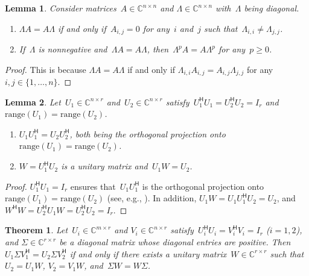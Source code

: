 \documentclass[11pt,a4paper]{article}
\newtheorem{theorem}{Theorem}%
\newtheorem{lemma}{Lemma}%
\theoremstyle{definition}
\def\CC{\mathbb{C}}
\newcommand{\hmt}{{\scriptscriptstyle{{\mathsf{H}}}}}
\newcommand{\range}{\mathrm{range}}
\newcommand{\eg}{{e.g.}}
\begin{document}
\begin{lemma}
  \label{lem:commute}
  Consider matrices~$A \in \CC^{n\times n}$ and $\Lambda \in \CC^{n\times n}$ with~$\Lambda$ being diagonal.
  \begin{enumerate}[leftmargin=1.5em]
  \item $\Lambda A = A\Lambda$ if and only if~$A_{i,j} = 0$ for any~$i$ and~$j$ such that~$\Lambda_{i,i}\neq \Lambda_{j,j}$.
  \item If~$\Lambda$ is nonnegative and~$\Lambda A = A\Lambda$, then~$\Lambda^p A = A \Lambda^p$ for
    any~$p\ge 0$.
  \end{enumerate}
\end{lemma}

\begin{proof} This is because
$\Lambda A = A \Lambda$ if and only if 
$\Lambda_{i,i} A_{i,j} = A_{i,j} \Lambda_{j,j}$ for any $i,j\in\{1, \dots, n\}$.
\end{proof}

\begin{lemma}
  \label{lem:unitary}
  Let~$U_1\in\CC^{n \times r}\!$ and~$U_2 \in \CC^{n\times r}\!$ satisfy~$U_1^\hmt U_1 = U_2^\hmt U_2
  = I_r$ and~$\range(U_1) = \range(U_2)$.
  \begin{enumerate}[leftmargin=1.5em]
    \item $U_1U_1^\hmt = U_2U_2^\hmt$, both being the orthogonal projection onto~$\range(U_1)
      = \range(U_2)$.
    \item $W=U_1^\hmt U_2$ is a unitary matrix and~$U_1W = U_2$. 
  \end{enumerate}
\end{lemma}

\begin{proof}
  $U_1^\hmt U_1 = I_r$ ensures that~$U_1U_1^\hmt$ is the orthogonal projection onto~$\range(U_1)
  = \range(U_2)$ (see, \eg, \cite{Han_Neumann_2013}). In addition,
 $U_1 W = U_1 U_1^\hmt U_2 = U_2$, and $W^\hmt W = U_2^\hmt U_1 W = U_2^\hmt U_2 = I_r$. 
\end{proof}


\begin{theorem}
  \label{th:svdunique}
  Let~$U_i\in \CC^{m\times r}$ and $V_i\in \CC^{n\times r}$ satisfy~$U_i^\hmt
  U_i=V_i^{\hmt} V_i = I_r$ \textnormal{(}$i=1,2$\textnormal{)}, and 
  $\Sigma \in \CC^{r\times r}$ be a diagonal matrix whose diagonal entries are positive. 
  Then~$U_1 \Sigma V_1^{\hmt} = U_2 \Sigma V_2^{\hmt}$ if and only if there exists
  a unitary matrix~$W\in\CC^{r\times r}$ such that~$U_2=U_1 W$, $V_2 = V_1 W$, and~$\Sigma
  W = W\Sigma$.
\end{theorem}
\end{document}
